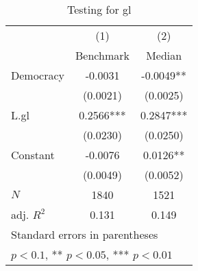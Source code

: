 \begin{table}[htbp]\centering
\def\sym#1{\ifmmode^{#1}\else\(^{#1}\)\fi}
\caption{Testing for gl \label{tab:regression6}}
\begin{tabular}{l*{2}{c}}
\hline\hline
            &\multicolumn{1}{c}{(1)}&\multicolumn{1}{c}{(2)}\\
            &\multicolumn{1}{c}{Benchmark}&\multicolumn{1}{c}{Median}\\
\hline
Democracy   &     -0.0031   &     -0.0049** \\
            &    (0.0021)   &    (0.0025)   \\
[1em]
L.gl        &      0.2566***&      0.2847***\\
            &    (0.0230)   &    (0.0250)   \\
[1em]
Constant    &     -0.0076   &      0.0126** \\
            &    (0.0049)   &    (0.0052)   \\
\hline
\(N\)       &        1840   &        1521   \\
adj. \(R^{2}\)&       0.131   &       0.149   \\
\hline\hline
\multicolumn{3}{l}{\footnotesize Standard errors in parentheses}\\
\multicolumn{3}{l}{\footnotesize * \(p<0.1\), ** \(p<0.05\), *** \(p<0.01\)}\\
\end{tabular}
\end{table}
